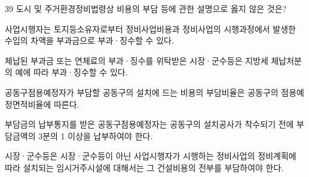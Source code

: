 \begin{question}{39}
도시 및 주거환경정비법령상 비용의 부담 등에 관한 설명으로 옳지 않은 것은?
\begin{choices}
  \item 사업시행자는 토지등소유자로부터 정비사업비용과 정비사업의 시행과정에서 발생한 수입의 차액을 부과금으로 부과·징수할 수 있다.
  \item 체납된 부과금 또는 연체료의 부과·징수를 위탁받은 시장·군수등은 지방세 체납처분의 예에 따라 부과·징수할 수 있다.
  \item 공동구점용예정자가 부담할 공동구의 설치에 드는 비용의 부담비율은 공동구의 점용예정면적비율에 따른다.
  \item 부담금의 납부통지를 받은 공동구점용예정자는 공동구의 설치공사가 착수되기 전에 부담금액의 3분의 1 이상을 납부하여야 한다.
  \item 시장·군수등은 시장·군수등이 아닌 사업시행자가 시행하는 정비사업의 정비계획에 따라 설치되는 임시거주시설에 대해서는 그 건설비용의 전부를 부담하여야 한다.
\end{choices}
\end{question}
